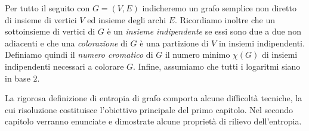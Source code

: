 Per tutto il seguito con $G=(V,E)$ indicheremo un grafo semplice non diretto di insieme di vertici $V$ ed insieme degli archi $E$. Ricordiamo inoltre che un sottoinsieme di vertici di $G$ è un \emph{insieme indipendente} se essi sono due a due non adiacenti e che una \emph{colorazione} di $G$ è una partizione di $V$ in insiemi indipendenti. Definiamo quindi il \emph{numero cromatico} di $G$ il numero minimo $\chi(G)$ di insiemi indipendenti necessari a colorare $G$. Infine, assumiamo che tutti i logaritmi siano in base $2$.

La rigorosa definizione di entropia di grafo comporta alcune difficoltà tecniche, la cui risoluzione costituisce l'obiettivo principale del primo capitolo. Nel secondo capitolo verranno enunciate e dimostrate alcune proprietà di rilievo dell'entropia.
